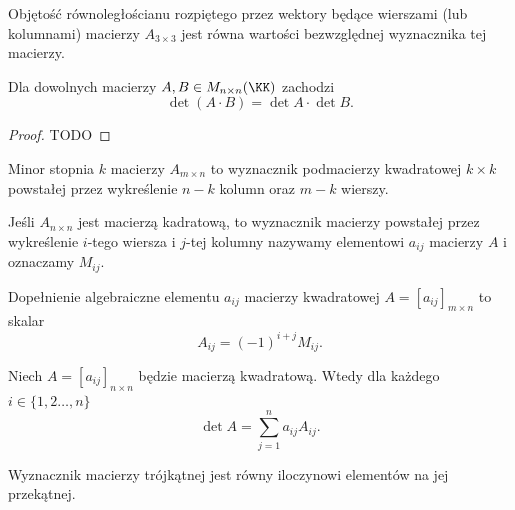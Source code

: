 \begin{fact}
    Objętość równoległościanu rozpiętego przez wektory będące wierszami (lub kolumnami) macierzy $A_{3\times 3}$ jest równa wartości bezwzględnej wyznacznika tej macierzy.
\end{fact}

\begin{theorem}
    \label{t:det is multiplicative}
    Dla dowolnych macierzy $A, B \in M_{n\times n}(\KK)$ zachodzi
    \[ \det(A\cdot B) = \det A \cdot \det B. \]
\end{theorem}
\begin{proof}
    TODO
\end{proof}

\begin{definition}
    Minor stopnia $k$ macierzy $A_{m\times n}$ to wyznacznik podmacierzy kwadratowej $k\times k$ powstałej przez wykreślenie $n-k$ kolumn oraz $m-k$ wierszy.
\end{definition}

Jeśli $A_{n\times n}$ jest macierzą kadratową, to wyznacznik macierzy powstałej przez wykreślenie $i$-tego wiersza i $j$-tej kolumny nazywamy  elementowi $a_{ij}$ macierzy $A$ i oznaczamy $M_{ij}$.

\begin{definition}
    Dopełnienie algebraiczne elementu $a_{ij}$ macierzy kwadratowej $A = [a_{ij}]_{m\times n}$ to skalar
    \[ A_{ij} = (-1)^{i+j}M_{ij}. \]
\end{definition}

\begin{theorem}[Laplace'a]
    \label{t:Laplace}
    Niech $A = [a_{ij}]_{n\times n}$ będzie macierzą kwadratową. Wtedy dla każdego $i \in \{1,2\ldots,n\}$ 
    \[ \det A = \sum_{j=1}^n a_{ij}A_{ij}. \]
\end{theorem}

\begin{corollary}
    \label{c:determinant in triangular matrix}
    Wyznacznik macierzy trójkątnej jest równy iloczynowi elementów na jej przekątnej.
\end{corollary}